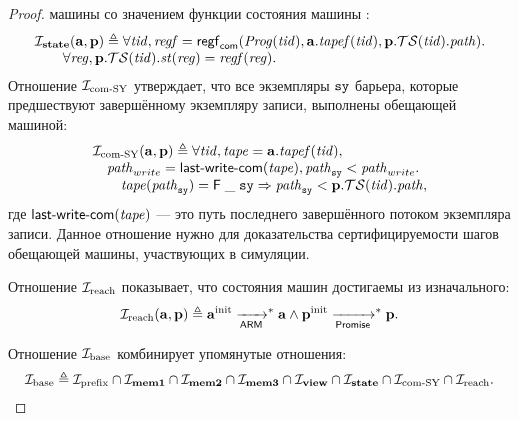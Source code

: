 \begin{proof}
машины со значением функции состояния машины \ARMt:
\[\begin{array}{l}
\mathcal{I}_{\rm \bf state}(\mathbf{a}, \mathbf{p}) \triangleq
  \forall \mathit{tid}, \mathit{regf} = \mathsf{regf}_\mathsf{com}(\mathit{Prog}(\mathit{tid}), \mathbf{a}.\mathit{tapef}(\mathit{tid}), \mathbf{p}.\mathcal{TS}(\mathit{tid}).\mathit{path}). \\
  \quad \quad \forall \mathit{reg}, \mathbf{p}.\mathcal{TS}(\mathit{tid}).\mathit{st}(\mathit{reg}) = \mathit{regf}(\mathit{reg}).\\
\end{array}\]
Отношение $\mathcal{I}_{\textup{\rm com-SY}}$ утверждает, что все экземпляры $\mathtt{sy}$ барьера, которые
предшествуют завершённому экземпляру записи, выполнены обещающей машиной:
\[\begin{array}{l}
\invComWrite(\aT, \p) \triangleq
  \forall \tId, \tape = \aT.\tapef(\tId), \\
  \quad \cpath_{write} = \lastCommittedWrite(\tape), \cpath_{\SY} < \cpath_{write}. \\
  \qquad  \tape(\cpath_{\SY}) = \tapeFence{\_}{\SY} \Rightarrow \cpath_{\SY} < \p.\TSfprom(\tId).\cpath,
\end{array}\]
где $\textup{\sf last-write-com}(\mathit{tape})$ --- это путь последнего завершённого потоком экземпляра записи.
Данное отношение нужно для доказательства сертифицируемости шагов обещающей машины,
участвующих в симуляции.

Отношение $\mathcal{I}_{\textup{\rm reach}}$ показывает, что состояния машин достигаемы из изначального:
\[\mathcal{I}_{\textup{\rm reach}}(\mathbf{a}, \mathbf{p}) \triangleq \mathbf{a}^{\rm init} \xrightarrow[\mathsf{ARM}]{}^{*} \mathbf{a} \land \mathbf{p}^{\rm init} \xrightarrow[\mathsf{Promise}]{}^{*} \mathbf{p}.\]

Отношение $\mathcal{I}_{\textup{\rm base}}$ комбинирует упомянутые отношения:
\[\mathcal{I}_{\textup{\rm base}} \triangleq \mathcal{I}_{\textup{\rm prefix}} \cap \mathcal{I}_{\rm \bf mem1} \cap \mathcal{I}_{\rm \bf mem2} \cap \mathcal{I}_{\rm \bf mem3} \cap \mathcal{I}_{\rm \bf view} \cap \mathcal{I}_{\rm \bf state} \cap \mathcal{I}_{\textup{\rm com-SY}} \cap \mathcal{I}_{\textup{\rm reach}}.\]


\end{proof}
